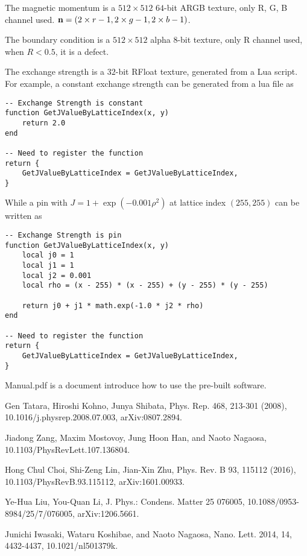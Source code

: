 \documentclass[aps,superscriptaddress,groupedaddress]{revtex4}  %
\begin{document}
The magnetic momentum is a $512\times 512$ $64$-bit ARGB texture, only R, G, B channel used. ${\bf n}=(2 \times r - 1, 2 \times g - 1, 2 \times b - 1)$.

The boundary condition is a $512\times 512$ alpha $8$-bit texture, only R channel used, when $R < 0.5$, it is a defect.

The exchange strength is a $32$-bit RFloat texture, generated from a Lua script. For example, a constant exchange strength can be generated from a lua file as


\begin{lstlisting}
-- Exchange Strength is constant
function GetJValueByLatticeIndex(x, y)
    return 2.0
end

-- Need to register the function
return {
    GetJValueByLatticeIndex = GetJValueByLatticeIndex,
}
\end{lstlisting}

While a pin with $J=1+\exp \left(-0.001 \rho ^2\right)$ at lattice index $(255, 255)$ can be written as
\begin{lstlisting}
-- Exchange Strength is pin
function GetJValueByLatticeIndex(x, y)
    local j0 = 1
    local j1 = 1
    local j2 = 0.001
    local rho = (x - 255) * (x - 255) + (y - 255) * (y - 255)

    return j0 + j1 * math.exp(-1.0 * j2 * rho)
end

-- Need to register the function
return {
    GetJValueByLatticeIndex = GetJValueByLatticeIndex,
}
\end{lstlisting}

Manual.pdf is a document introduce how to use the pre-built software.

\begin{thebibliography}{99}


Gen Tatara, Hiroshi Kohno, Junya Shibata, Phys. Rep. 468, 213-301 (2008), 10.1016/j.physrep.2008.07.003, arXiv:0807.2894.

Jiadong Zang, Maxim Mostovoy, Jung Hoon Han, and Naoto Nagaosa, 10.1103/PhysRevLett.107.136804.

Hong Chul Choi, Shi-Zeng Lin, Jian-Xin Zhu, Phys. Rev. B 93, 115112 (2016), 10.1103/PhysRevB.93.115112, arXiv:1601.00933.

Ye-Hua Liu, You-Quan Li, J. Phys.: Condens. Matter 25 076005, 10.1088/0953-8984/25/7/076005, arXiv:1206.5661.

Junichi Iwasaki, Wataru Koshibae, and Naoto Nagaosa, Nano. Lett. 2014, 14, 4432-4437, 10.1021/nl501379k.

\end{thebibliography}
\end{document}
